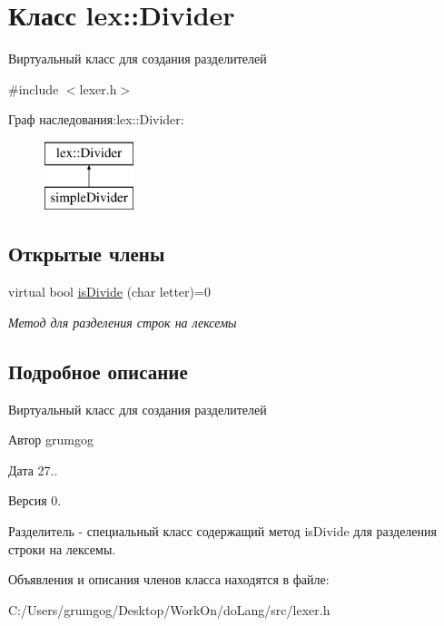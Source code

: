 \hypertarget{classlex_1_1_divider}{}\section{Класс lex\+:\+:Divider}
\label{classlex_1_1_divider}


Виртуальный класс для создания разделителей  




{\ttfamily \#include $<$lexer.\+h$>$}

Граф наследования\+:lex\+:\+:Divider\+:\begin{figure}[H]
\begin{center}
\leavevmode
\includegraphics[height=2.000000cm]{classlex_1_1_divider}
\end{center}
\end{figure}
\subsection*{Открытые члены}
\begin{DoxyCompactItemize}
\item 
\mbox{\label{classlex_1_1_divider_ac8cfe376aa8c0b04219b0512bfb6cb25}} 
virtual bool \mbox{\hyperlink{classlex_1_1_divider_ac8cfe376aa8c0b04219b0512bfb6cb25}{is\+Divide}} (char letter)=0
\begin{DoxyCompactList}\small\item\em Метод для разделения строк на лексемы \end{DoxyCompactList}\end{DoxyCompactItemize}


\subsection{Подробное описание}
Виртуальный класс для создания разделителей 

\begin{DoxyAuthor}{Автор}
grumgog 
\end{DoxyAuthor}
\begin{DoxyDate}{Дата}
27.. 
\end{DoxyDate}
\begin{DoxyVersion}{Версия}
0.
\end{DoxyVersion}
Разделитель -\/ специальный класс содержащий метод is\+Divide для разделения строки на лексемы. 

Объявления и описания членов класса находятся в файле\+:\begin{DoxyCompactItemize}
\item 
C\+:/\+Users/grumgog/\+Desktop/\+Work\+On/do\+Lang/src/lexer.\+h\end{DoxyCompactItemize}
